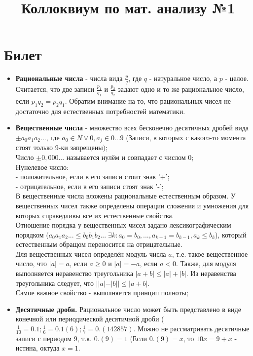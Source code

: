\documentclass[12pt,a4paper]{article}
\title{Коллоквиум по мат. анализу №1}
\begin{document}
\maketitle
\section{Билет}
\begin{itemize}
\item \textbf{Рациональные числа} - числа вида $\frac{p}{q}$, где $q$ - натуральное число, а $p$ - целое. Считается, что две записи $\frac{p_1}{q_1}$ и  $\frac{p_2}{q_2}$ задают одно и то же рациональное число, если $p_1q_2=p_2q_1$. Обратим внимание на то, что рациональных чисел не достаточно для естественных потребностей математики.

\item \textbf{Вещественные числа} - множество всех бесконечно десятичных дробей вида $\pm a_0a_1a_2...$, где $a_0 \in N \vee {0}, a_j \in {0...9}$ (Записи, в которых с какого-то момента стоят только 9-ки запрещены); \\
Число $\pm 0,000...$ называется нулём и совпадает с числом 0;\\
Нунелевое число: \\
- положительное, если в его записи стоит знак '+'; \\
- отрицательное, если в его записи стоят знак '-'; \\
В вещественные числа вложены рациональные естественным образом. У вещественных чисел также определены операции сложения и умножения для которых справедливы все их естественные свойства. \\
Отношение порядка у вещественных чисел задано лексикографическим порядком ($a_0a_1a_2...\leq b_0b_1b_2... \; \exists k: a_0 = b_0, ..., a_{k-1}=b_{k-1}, a_k \leq b_k$), который естественным обращом переносится на отрицательные. \\
Для вещественных чисел определён модуль числа $a$, т.е. такое вещественное число, что $|a| = a$, если $a \geq 0$ и $|a| = -a$, если $a < 0$. Также, для модуля выполняется неравенство треугольника $|a+b| \leq |a| + |b|$. Из неравенства треугольника следует, что $||a|-|b|| \leq |a+b|$. \\
Самое важное свойство - выполняется принцип полноты;

\item \textbf{Десятичные дроби.} Рациональное число может быть представлено в виде конечной или периодической десятичной дроби ($\frac{1}{10} = 0.1; \frac{1}{6} = 0.1(6); \frac{1}{7} = 0.(142857)$. Можно не рассматривать десятичные записи с периодом 9, т.к. $0.(9) = 1$ (Если $0.(9) = x$, то $10x=9+x$ - истина, октуда $x = 1$.


\end{itemize}
\end{document}

